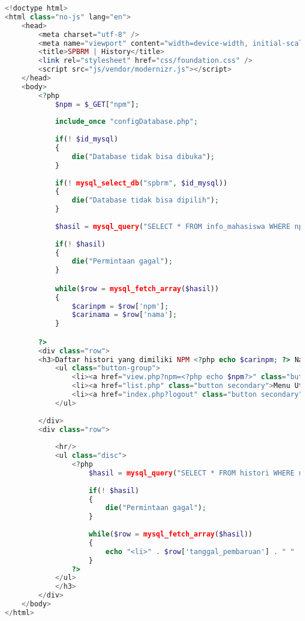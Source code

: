 \begin{lstlisting}[language=php,basicstyle=\tiny,caption=history.php]
<!doctype html>
<html class="no-js" lang="en">
	<head>
		<meta charset="utf-8" />
		<meta name="viewport" content="width=device-width, initial-scale=1.0" />
		<title>SPBRM | History</title>
		<link rel="stylesheet" href="css/foundation.css" />
		<script src="js/vendor/modernizr.js"></script>
	</head>
	<body>
		<?php
			$npm = $_GET["npm"];
			
			include_once "configDatabase.php";
				
			if(! $id_mysql)
			{
				die("Database tidak bisa dibuka");
			}
				
			if(! mysql_select_db("spbrm", $id_mysql))
			{
				die("Database tidak bisa dipilih");
			}
			
			$hasil = mysql_query("SELECT * FROM info_mahasiswa WHERE npm='$npm'", $id_mysql);
			
			if(! $hasil)
			{
				die("Permintaan gagal");
			}

			while($row = mysql_fetch_array($hasil))
			{
				$carinpm = $row['npm'];
				$carinama = $row['nama'];
			}

		?> 
		<div class="row">
		<h3>Daftar histori yang dimiliki NPM <?php echo $carinpm; ?> Nama <?php echo $carinama; ?>
			<ul class="button-group">
				<li><a href="view.php?npm=<?php echo $npm?>" class="button secondary">Kembali</a></li>
				<li><a href="list.php" class="button secondary">Menu Utama</a></li>
				<li><a href="index.php?logout" class="button secondary">Logout</a></li>
			</ul>
			
		</div>
		<div class="row">
			
			<hr/>
			<ul class="disc">
				<?php
					$hasil = mysql_query("SELECT * FROM histori WHERE npm='$npm' ORDER BY id_histori DESC", $id_mysql);
			
					if(! $hasil)
					{
						die("Permintaan gagal");
					}
					
					while($row = mysql_fetch_array($hasil))
					{
						echo "<li>" . $row['tanggal_pembaruan'] . " " . $row['pengguna'] . " " . $row['status'] . " " . $row['npm'] . " " . ($row['keterangan'] != "" ? '<a href="past.php?id= '. $row['id_histori'] .'">[lihat versi ini]</a>' : "") . "</li>";
					}
				?>
			</ul>
			</h3>
		</div>
	</body>
</html>
\end{lstlisting}

